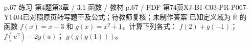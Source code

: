 \par\noindent\begin{minipage}{\linewidth}
\begin{bankitem}{p.67 练习 第4题}{第3章 / 3.1 函数 / 教材 p.67 / PDF 第74页}{XJ-B1-C03-PR-P067-Y1404}{已对照原页转写题干及公式；待教师复核；未制作答案}
已知定义域为 $\mathbb R$ 的函数 $f(x)=x-3$ 和 $g(x)=x^2+1$，计算下列各式：
$f(2)+g(-1)$；
$f(u^2)-2g(u)$；
$g(g(g(1)))$。
\end{bankitem}
\end{minipage}\par\medskip
